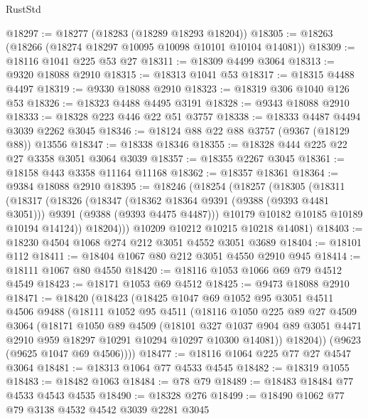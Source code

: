 \begin{lexlean}{RustStd}
\begin{coremodule}
@18297 := @18277 (@18283 (@18289 @18293 @18204))
@18305 := @18263 (@18266 (@18274 @18297 @10095 @10098 @10101 @10104 @14081))
@18309 := @18116 @1041 @225 @53 @27
@18311 := @18309 @4499 @3064
@18313 := @9320 @18088 @2910
@18315 := @18313 @1041 @53
@18317 := @18315 @4488 @4497
@18319 := @9330 @18088 @2910
@18323 := @18319 @306 @1040 @126 @53
@18326 := @18323 @4488 @4495 @3191
@18328 := @9343 @18088 @2910
@18333 := @18328 @223 @446 @22 @51 @3757
@18338 := @18333 @4487 @4494 @3039 @2262 @3045
@18346 := @18124 @88 @22 @88 @3757 (@9367 (@18129 @88)) @13556
@18347 := @18338 @18346
@18355 := @18328 @444 @225 @22 @27 @3358 @3051 @3064 @3039
@18357 := @18355 @2267 @3045
@18361 := @18158 @443 @3358 @11164 @11168
@18362 := @18357 @18361
@18364 := @9384 @18088 @2910
@18395 := @18246
    (@18254
      (@18257
        (@18305
          (@18311
            (@18317
              (@18326
                (@18347
                  (@18362 @18364 @9391 (@9388 (@9393 @4481 @3051)))
                  @9391
                  (@9388 (@9393 @4475 @4487)))
                @10179
                @10182
                @10185
                @10189
                @10194
                @14124))
            @18204)))
      @10209
      @10212
      @10215
      @10218
      @14081)
@18403 := @18230 @4504 @1068 @274 @212 @3051 @4552 @3051 @3689
@18404 := @18101 @112
@18411 := @18404 @1067 @80 @212 @3051 @4550 @2910 @945
@18414 := @18111 @1067 @80 @4550
@18420 := @18116 @1053 @1066 @69 @79 @4512 @4549
@18423 := @18171 @1053 @69 @4512
@18425 := @9473 @18088 @2910
@18471 := @18420
    (@18423
      (@18425
        @1047
        @69
        @1052
        @95
        @3051
        @4511
        @4506
        @9488
        (@18111
          @1052
          @95
          @4511
          (@18116
            @1050
            @225
            @89
            @27
            @4509
            @3064
            (@18171
              @1050
              @89
              @4509
              (@18101
                @327
                @1037
                @904
                @89
                @3051
                @4471
                @2910
                @959
                @18297
                @10291
                @10294
                @10297
                @10300
                @14081))
            @18204))
        (@9623 (@9625 @1047 @69 @4506))))
@18477 := @18116 @1064 @225 @77 @27 @4547 @3064
@18481 := @18313 @1064 @77 @4533 @4545
@18482 := @18319 @1055
@18483 := @18482 @1063
@18484 := @78 @79
@18489 := @18483 @18484 @77 @4533 @4543 @4535
@18490 := @18328 @276
@18499 := @18490 @1062 @77 @79 @3138 @4532 @4542 @3039 @2281 @3045

\end{coremodule}
\end{lexlean}
